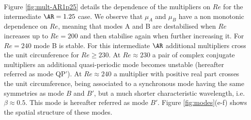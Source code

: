 Figure \ref{fig:mult-AR1p25} details the dependence of the multipliers on $Re$ for the intermediate $\AR=1.25$ case. We observe that $\mu_A$ and $\mu_B$ have a non monotonic dependence on $Re$, meaning that modes A and B are destabilised when $Re$ increases up to $Re = 200$ and then stabilise again when further increasing it. For $Re=240$ mode B is stable. For this intermediate $\AR$ additional multipliers cross the unit circunference for $Re \ge 230$. At $Re \approx 230$ a pair of complex conjugate multipliers an additional quasi-periodic mode becomes unstable (hereafter referred as mode QP'). At $Re \approx 240$ a multiplier with positive real part crosses the unit circumference, being associated to a synchronous mode having the same symmetries as mode $B$ and $B'$, but a much shorter characteristic wavelength, i.e. $\beta \approx 0.5$. This mode is hereafter referred as mode $B'$. Figure \ref{fig:modes}(e-f) shows the spatial structure of these modes.




